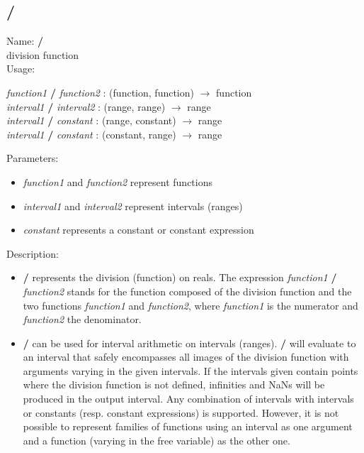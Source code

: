 \subsection{/}
\label{labdivide}
\noindent Name: \textbf{/}\\
division function\\
\noindent Usage: 
\begin{center}
\emph{function1} \textbf{/} \emph{function2} : (\textsf{function}, \textsf{function}) $\rightarrow$ \textsf{function}\\
\emph{interval1} \textbf{/} \emph{interval2} : (\textsf{range}, \textsf{range}) $\rightarrow$ \textsf{range}\\
\emph{interval1} \textbf{/} \emph{constant} : (\textsf{range}, \textsf{constant}) $\rightarrow$ \textsf{range}\\
\emph{interval1} \textbf{/} \emph{constant} : (\textsf{constant}, \textsf{range}) $\rightarrow$ \textsf{range}\\
\end{center}
Parameters: 
\begin{itemize}
\item \emph{function1} and \emph{function2} represent functions
\item \emph{interval1} and \emph{interval2} represent intervals (ranges)
\item \emph{constant} represents a constant or constant expression
\end{itemize}
\noindent Description: \begin{itemize}

\item \textbf{/} represents the division (function) on reals. 
   The expression \emph{function1} \textbf{/} \emph{function2} stands for
   the function composed of the division function and the two
   functions \emph{function1} and \emph{function2}, where \emph{function1} is
   the numerator and \emph{function2} the denominator.

\item \textbf{/} can be used for interval arithmetic on intervals
   (ranges). \textbf{/} will evaluate to an interval that safely
   encompasses all images of the division function with arguments
   varying in the given intervals. If the intervals given contain points
   where the division function is not defined, infinities and NaNs will be
   produced in the output interval.  Any combination of intervals with
   intervals or constants (resp. constant expressions) is
   supported. However, it is not possible to represent families of
   functions using an interval as one argument and a function (varying in
   the free variable) as the other one.
\end{itemize}
